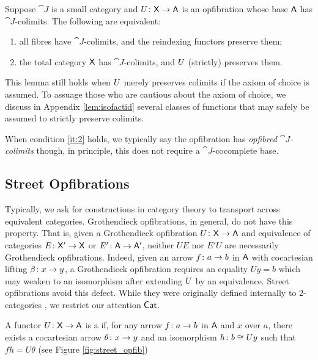 \documentclass{amsart}
\begin{document}
\begin{lem}\label{lem:fibrewiselimits}
  Suppose $\cat{J}$ is a small category and $U\colon\mathsf{X}\to\mathsf{A}$ is an
  opfibration whose base $\mathsf{A}$ has $\cat{J}$-colimits. The following
  are equivalent:
\begin{enumerate}
 \item all fibres have $\cat{J}$-colimits, and the reindexing functors preserve them; \label{it:2}
 \item the total category $\mathsf{X}$ has $\cat{J}$-colimits, and $U$ (strictly) preserves them.
\end{enumerate}
\end{lem}

\begin{remark}
  This lemma still holds when $U$ merely preserves colimits if the axiom of
  choice is assumed. To assuage those who are cautious about the axiom
  of choice, we discuss in Appendix \ref{lem:isofactid} several
  classes of functions that may safely be assumed to strictly preserve
  colimits.
\end{remark}

When condition \ref{it:2} holds, we typically say the opfibration has
\emph{opfibred $\cat{J}$-colimits} though, in principle, this does not
require a $\cat{J}$-cocomplete base.

\subsection{Street Opfibrations}

Typically, we ask for constructions in category theory to transport
across equivalent categories. Grothendieck opfibrations, in general,
do not have this property. That is, given a Grothendieck opfibration
$U \colon \mathsf{X} \to \mathsf{A}$ and equivalence of categories $E \colon \mathsf{X}' \to \mathsf{X}$
or $E' \colon \mathsf{A} \to \mathsf{A}'$, neither $UE$ nor $E'U$ are necessarily
Grothendieck opfibrations.  Indeed, given an arrow $f \colon a \to b$
in $\mathsf{A}$ with cocartesian lifting $\beta \colon x \to y$, a Grothendieck
opfibration requires an equality $Uy=b$ which may weaken to an
isomorphism after extending $U$ by an equivalence. Street
opfibrations avoid this defect. While they were originally defined
internally to 2-categories \cite{FibYon}, we restrict our attention $\mathsf{Cat}$.

\begin{defn}
  A functor $ U \colon \mathsf{X} \to \mathsf{A} $ is a  if,
  for any arrow $ f \colon a \to b $ in $ \mathsf{A} $ and $ x $ over $ a $,
  there exists a cocartesian arrow $ \theta \colon x \to y $ and an
  isomorphism $ h \colon b \cong Uy $ such that $ fh = U\theta $ (see
  Figure \ref{fig:street_opfib})
\end{defn}
\end{document}
